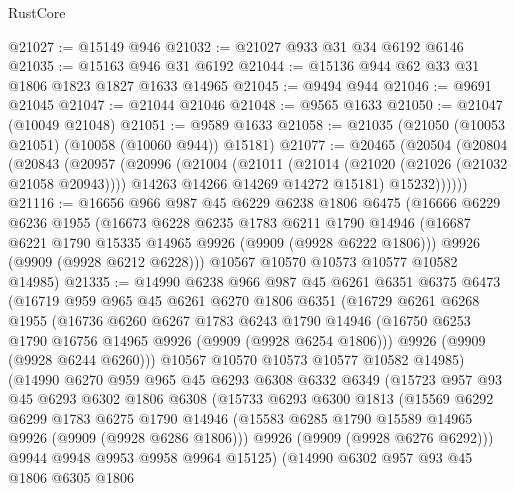 \begin{lexlean}{RustCore}
\begin{coremodule}
@21027 := @15149 @946
@21032 := @21027 @933 @31 @34 @6192 @6146
@21035 := @15163 @946 @31 @6192
@21044 := @15136 @944 @62 @33 @31 @1806 @1823 @1827 @1633 @14965
@21045 := @9494 @944
@21046 := @9691 @21045
@21047 := @21044 @21046
@21048 := @9565 @1633
@21050 := @21047 (@10049 @21048)
@21051 := @9589 @1633
@21058 := @21035 (@21050 (@10053 @21051) (@10058 (@10060 @944)) @15181)
@21077 := @20465
    (@20504
      (@20804
        (@20843
          (@20957
            (@20996
              (@21004
                (@21011
                  (@21014 (@21020 (@21026 (@21032 @21058 @20943))))
                  @14263
                  @14266
                  @14269
                  @14272
                  @15181)
                @15232))))))
@21116 := @16656
    @966
    @987
    @45
    @6229
    @6238
    @1806
    @6475
    (@16666
      @6229
      @6236
      @1955
      (@16673
        @6228
        @6235
        @1783
        @6211
        @1790
        @14946
        (@16687 @6221 @1790 @15335 @14965 @9926 (@9909 (@9928 @6222 @1806)))
        @9926
        (@9909 (@9928 @6212 @6228)))
      @10567
      @10570
      @10573
      @10577
      @10582
      @14985)
@21335 := @14990
    @6238
    @966
    @987
    @45
    @6261
    @6351
    @6375
    @6473
    (@16719
      @959
      @965
      @45
      @6261
      @6270
      @1806
      @6351
      (@16729
        @6261
        @6268
        @1955
        (@16736
          @6260
          @6267
          @1783
          @6243
          @1790
          @14946
          (@16750 @6253 @1790 @16756 @14965 @9926 (@9909 (@9928 @6254 @1806)))
          @9926
          (@9909 (@9928 @6244 @6260)))
        @10567
        @10570
        @10573
        @10577
        @10582
        @14985)
      (@14990
        @6270
        @959
        @965
        @45
        @6293
        @6308
        @6332
        @6349
        (@15723
          @957
          @93
          @45
          @6293
          @6302
          @1806
          @6308
          (@15733
            @6293
            @6300
            @1813
            (@15569
              @6292
              @6299
              @1783
              @6275
              @1790
              @14946
              (@15583 @6285 @1790 @15589 @14965 @9926 (@9909 (@9928 @6286 @1806)))
              @9926
              (@9909 (@9928 @6276 @6292)))
            @9944
            @9948
            @9953
            @9958
            @9964
            @15125)
          (@14990
            @6302
            @957
            @93
            @45
            @1806
            @6305
            @1806

\end{coremodule}
\end{lexlean}
